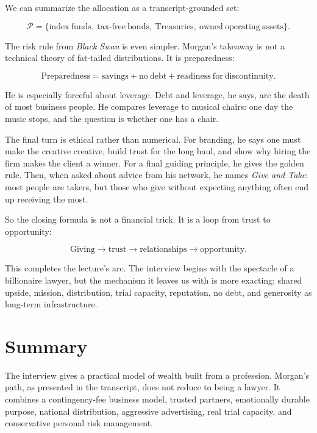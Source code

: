 We can summarize the allocation as a transcript-grounded set:

\begin{equation}
\mathcal{P}
=
\{\mathrm{index\ funds},\ \mathrm{tax\mbox{-}free\ bonds},\ \mathrm{Treasuries},\ \mathrm{owned\ operating\ assets}\}.
\end{equation}

The risk rule from \emph{Black Swan} is even simpler. Morgan's takeaway is not a technical theory of fat-tailed distributions. It is preparedness:

\begin{equation}
\mathrm{Preparedness}
=
\mathrm{savings}
+
\mathrm{no\ debt}
+
\mathrm{readiness\ for\ discontinuity}.
\end{equation}

He is especially forceful about leverage. Debt and leverage, he says, are the death of most business people. He compares leverage to musical chairs: one day the music stops, and the question is whether one has a chair.

The final turn is ethical rather than numerical. For branding, he says one must make the creative creative, build trust for the long haul, and show why hiring the firm makes the client a winner. For a final guiding principle, he gives the golden rule. Then, when asked about advice from his network, he names \emph{Give and Take}: most people are takers, but those who give without expecting anything often end up receiving the most.

So the closing formula is not a financial trick. It is a loop from trust to opportunity:

\begin{equation}
\mathrm{Giving}
\longrightarrow
\mathrm{trust}
\longrightarrow
\mathrm{relationships}
\longrightarrow
\mathrm{opportunity}.
\end{equation}

This completes the lecture's arc. The interview begins with the spectacle of a billionaire lawyer, but the mechanism it leaves us with is more exacting: shared upside, mission, distribution, trial capacity, reputation, no debt, and generosity as long-term infrastructure.

\section{Summary}

The interview gives a practical model of wealth built from a profession. Morgan's path, as presented in the transcript, does not reduce to being a lawyer. It combines a contingency-fee business model, trusted partners, emotionally durable purpose, national distribution, aggressive advertising, real trial capacity, and conservative personal risk management.

